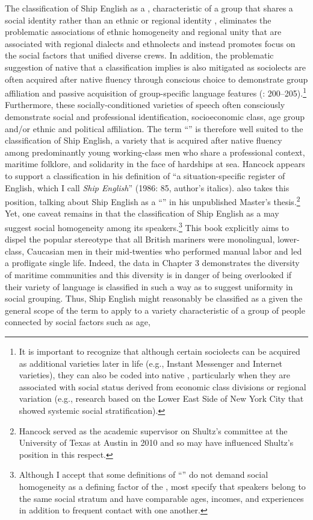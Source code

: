 The classification of Ship English as a , characteristic of a group that shares a social identity rather than an ethnic or regional identity \citep[122]{Trudgill2003}, eliminates the problematic associations of ethnic homogeneity and regional unity that are associated with regional dialects and ethnolects and instead promotes focus on the social factors that unified diverse crews. In addition, the problematic suggestion of native  that a  classification implies is also mitigated as sociolects are often acquired after native fluency through conscious choice to demonstrate group affiliation and passive acquisition of group-specific language features (\citealt{Durrell2004}: 200–205).\footnote{It is important to recognize that although certain sociolects can be acquired as additional varieties later in life (e.g., Instant Messenger and Internet varieties), they can also be coded into native , particularly when they are associated with social status derived from economic class divisions or regional variation (e.g.,  research based on the Lower East Side of New York City that showed systemic social stratification).}  Furthermore, these socially-conditioned varieties of speech often consciously demonstrate social and professional identification, socioeconomic class, age group and/or ethnic and political affiliation. The term “” is therefore well suited to the classification of Ship English, a variety that is acquired after native fluency among predominantly young working-class men who share a professional context, maritime folklore, and solidarity in the face of hardships at sea. Hancock appears to support a  classification in his definition of “a situation-specific register of English, which I call \textit{Ship English}” (1986: 85, author’s italics). \citet{Schultz2010} also takes this position, talking about Ship English as a “” in his unpublished Master’s thesis.\footnote{Hancock served as the academic supervisor on Shultz’s committee at the University of Texas at Austin in 2010 and so may have influenced Shultz’s position in this respect.}  Yet, one caveat remains in that the classification of Ship English as a  may suggest social homogeneity among its speakers.\footnote{Although I accept that some definitions of “” do not demand social homogeneity as a defining factor of the , most specify that speakers belong to the same social stratum and have comparable ages, incomes, and experiences in addition to frequent contact with one another.}  This book explicitly aims to dispel the popular stereotype that all British mariners were monolingual, lower-class, Caucasian men in their mid-twenties who performed manual labor and led a profligate single life. Indeed, the data in Chapter 3 demonstrates the diversity of maritime communities and this diversity is in danger of being overlooked if their variety of language is classified in such a way as to suggest uniformity in social grouping. Thus, Ship English might reasonably be classified as a  given the general scope of the term to apply to a variety characteristic of a group of people connected by social factors such as age, 